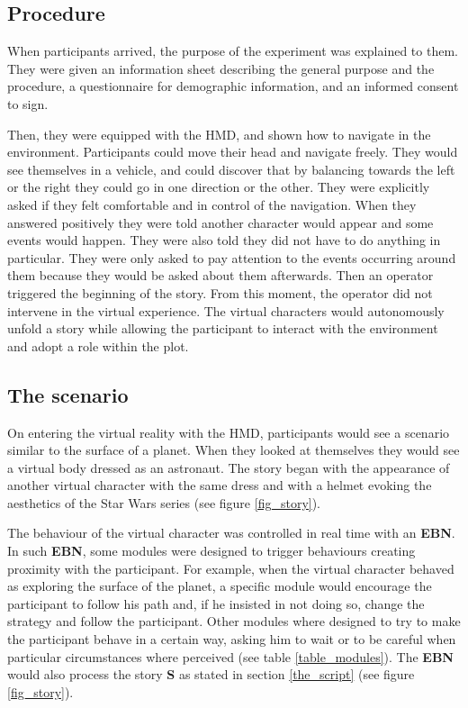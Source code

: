 \documentclass[
		twoside,openright,titlepage,numbers=noenddot,manychapters,
		headinclude,%
                footinclude=false,cleardoublepage=empty,
                BCOR=5mm,
		fontsize=11pt, %
                 enabledeprecatedfontcommands]{scrreprt}
\begin{document}
\subsection{Procedure}
When participants arrived, the purpose of the experiment was explained to them. They were given an information sheet describing the general purpose and the procedure, a questionnaire for demographic information, and an informed consent to sign. 

Then, they were equipped with the HMD, and shown how to navigate in the environment. Participants could move their head and navigate freely. They would see themselves in a vehicle, and could discover that by balancing towards the left or the right they could go in one direction or the other. They were explicitly asked if they felt comfortable and in control of the navigation. When they answered positively they were told another character would appear and some events would happen. They were also told they did not have to do anything in particular. They were only asked to pay attention to the events occurring around them because they would be asked about them afterwards. Then an operator triggered the beginning of the story. From this moment, the operator did not intervene in the virtual experience. The virtual characters would autonomously unfold a story while allowing the participant to interact with the environment and adopt a role within the plot. 

\subsection{The scenario}
On entering the virtual reality with the HMD, participants would see a scenario similar to the surface of a planet. When they looked at themselves they would see a virtual body dressed as an astronaut. The story began with the appearance of another virtual character with the same dress and with a helmet evoking the aesthetics of the Star Wars series (see figure \ref{fig_story}). 

The behaviour of the virtual character was controlled in real time with an \textbf{EBN}. In such \textbf{EBN}, some modules were designed to trigger behaviours creating proximity with the participant. For example, when the virtual character behaved as exploring the surface of the planet, a specific module would encourage the participant to follow his path and, if he insisted in not doing so, change the strategy and follow the participant. Other modules where designed to try to make the participant behave in a certain way, asking him to wait or to be careful when particular circumstances where perceived (see table \ref{table_modules}). The \textbf{EBN} would also process the story \textbf{S} as stated in section \ref{the_script} (see figure \ref{fig_story}). 
\end{document}
